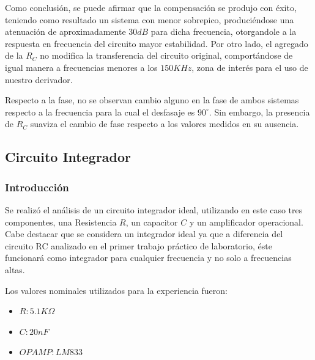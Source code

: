 Como conclusión, se puede afirmar que la compensación se produjo con éxito, teniendo como 
resultado un sistema con menor sobrepico, produciéndose una atenuación de aproximadamente
$30dB$ para dicha frecuencia, otorgandole a la respuesta en frecuencia del circuito mayor 
estabilidad. Por otro lado, el agregado 
de la $R_C$ no modifica la transferencia del circuito original, comportándose de igual manera 
a frecuencias menores a los $150KHz$, zona de interés para el uso de nuestro derivador. \par 
Respecto a la fase, no se observan cambio alguno en la fase de ambos sistemas respecto a la frecuencia para 
la cual el desfasaje es $90^\circ$. Sin embargo, la presencia de $R_C$ suaviza el cambio de fase respecto a los
valores medidos en su ausencia.







\subsection{Circuito Integrador}

\subsubsection{Introducción}

Se realizó el análisis de un circuito integrador ideal, utilizando en este caso tres componentes, una Resistencia $R$,
un capacitor $C$ y un amplificador operacional. 
Cabe destacar que se considera un integrador ideal ya que a diferencia del circuito RC analizado en el primer trabajo práctico de laboratorio,
éste funcionará como integrador para cualquier frecuencia y no solo a frecuencias altas. 

Los valores nominales utilizados para la experiencia fueron:

\begin{itemize}
	\item $R: 5.1K \Omega$ 
	\item $C: 20nF$
	\item $OPAMP: LM833$
\end{itemize}

